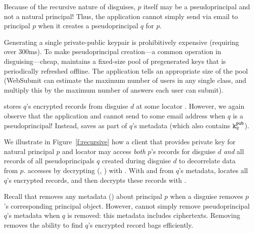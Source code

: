 Because of the recursive nature of disguises, $p$ itself may be a pseudoprincipal and not a natural
principal! Thus, the application cannot simply send  via \eg email to principal $p$ when it
creates a pseudoprincipal $q$ for $p$.

Generating a single private-public keypair is prohibitively expensive (requiring over 300ms). To
make pseudoprincipal creation---a common operation in disguising---cheap, \sys maintains a
fixed-size pool of pregenerated keys that is periodically refreshed offline. The application tells
\sys an appropriate size of the pool (\eg WebSubmit can estimate the maximum number of users in any
single class, and multiply this by the maximum number of answers each user can submit).

\sys stores $q$'s encrypted records from disguise $d$ at some locator .  However, we again
observe that the application and \sys cannot send  to some email address when $q$ is a
pseudoprincipal! Instead, \sys saves  as part of $q$'s metadata (which also contains $\texttt{\ensuremath{\texttt{k}^{\text{pub}}_{q}}}$).


We illustrate in Figure~\ref{f:recursive} how a client that provides private key  for
natural principal $p$ and locator  may access \emph{both} $p$'s records for disguise $d$
\emph{and} all records of all pseudoprincipals $q$ created during disguise $d$ to decorrelate data
from $p$.  \sys accesses  by decrypting \enc(, ) with . With
 and  from $q$'s metadata, \sys locates all $q$'s encrypted records,
and then decrypts these records with .


Recall that \sys removes any metadata (\eg {}) about principal $p$ when a disguise removes
$p$'s corresponding principal object.
However, \sys cannot simply remove pseudoprincipal $q$'s metadata when $q$ is removed: this metadata
includes  ciphertexts. Removing  removes the ability to find $q$'s encrypted
record bags efficiently.

